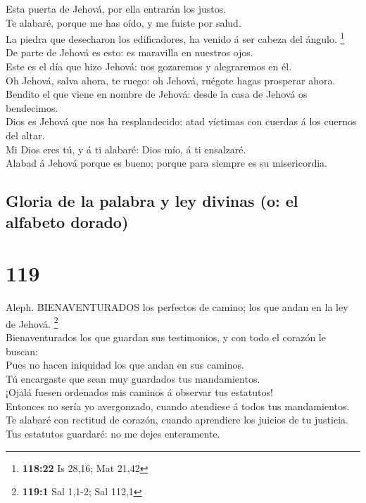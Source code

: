  Esta puerta de Jehová, por ella entrarán los justos.\\
 Te alabaré, porque me has oído, y me fuiste por salud.\\
 La piedra que desecharon los edificadores, ha venido á
ser cabeza del ángulo. \footnote{\textbf{118:22} Is 28,16; Mat 21,42}\\
 De parte de Jehová es esto: es maravilla en nuestros
ojos.\\
 Este es el día que hizo Jehová: nos gozaremos y
alegraremos en él.\\
 Oh Jehová, salva ahora, te ruego: oh Jehová, ruégote
hagas prosperar ahora.\\
 Bendito el que viene en nombre de Jehová: desde la casa
de Jehová os bendecimos.\\
 Dios es Jehová que nos ha resplandecido: atad víctimas
con cuerdas á los cuernos del altar.\\
 Mi Dios eres tú, y á ti alabaré: Dios mío, á ti
ensalzaré.\\
 Alabad á Jehová porque es bueno; porque para siempre es
su misericordia.

\hypertarget{gloria-de-la-palabra-y-ley-divinas-o-el-alfabeto-dorado}{%
\subsection{Gloria de la palabra y ley divinas (o: el alfabeto
dorado)}\label{gloria-de-la-palabra-y-ley-divinas-o-el-alfabeto-dorado}}

\hypertarget{section-118}{%
\section{119}\label{section-118}}

 Aleph. BIENAVENTURADOS los perfectos de camino; los que
andan en la ley de Jehová. \footnote{\textbf{119:1} Sal 1,1-2; Sal 112,1}\\
 Bienaventurados los que guardan sus testimonios, y con
todo el corazón le buscan:\\
 Pues no hacen iniquidad los que andan en sus caminos.\\
 Tú encargaste que sean muy guardados tus mandamientos.\\
 ¡Ojalá fuesen ordenados mis caminos á observar tus
estatutos!\\
 Entonces no sería yo avergonzado, cuando atendiese á
todos tus mandamientos.\\
 Te alabaré con rectitud de corazón, cuando aprendiere los
juicios de tu justicia.\\
 Tus estatutos guardaré: no me dejes enteramente.

